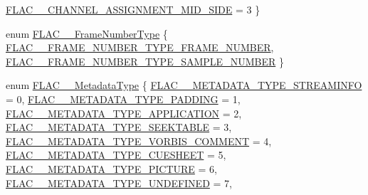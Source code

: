 \begin{DoxyCompactItemize}
\hyperlink{group__flac__format_gga79855f8525672e37f299bbe02952ef9ca85c1512c0473b5ede364a9943759a80c}{F\+L\+A\+C\+\_\+\+\_\+\+C\+H\+A\+N\+N\+E\+L\+\_\+\+A\+S\+S\+I\+G\+N\+M\+E\+N\+T\+\_\+\+M\+I\+D\+\_\+\+S\+I\+DE} = 3
 \}
\item 
enum \hyperlink{group__flac__format_ga8fe9ebc78386cd2a3d23b7b8e3818e1c}{F\+L\+A\+C\+\_\+\+\_\+\+Frame\+Number\+Type} \{ \hyperlink{group__flac__format_gga8fe9ebc78386cd2a3d23b7b8e3818e1ca0b9cbf3853f0ae105cf9b5360164f794}{F\+L\+A\+C\+\_\+\+\_\+\+F\+R\+A\+M\+E\+\_\+\+N\+U\+M\+B\+E\+R\+\_\+\+T\+Y\+P\+E\+\_\+\+F\+R\+A\+M\+E\+\_\+\+N\+U\+M\+B\+ER}, 
\hyperlink{group__flac__format_gga8fe9ebc78386cd2a3d23b7b8e3818e1ca9220ce93dcc151e5edd5db7e7155b35a}{F\+L\+A\+C\+\_\+\+\_\+\+F\+R\+A\+M\+E\+\_\+\+N\+U\+M\+B\+E\+R\+\_\+\+T\+Y\+P\+E\+\_\+\+S\+A\+M\+P\+L\+E\+\_\+\+N\+U\+M\+B\+ER}
 \}
\item 
enum \hyperlink{group__flac__format_gac71714ba8ddbbd66d26bb78a427fac01}{F\+L\+A\+C\+\_\+\+\_\+\+Metadata\+Type} \{ \newline
\hyperlink{group__flac__format_ggac71714ba8ddbbd66d26bb78a427fac01acffa517e969ba6a868dcf10e5da75c28}{F\+L\+A\+C\+\_\+\+\_\+\+M\+E\+T\+A\+D\+A\+T\+A\+\_\+\+T\+Y\+P\+E\+\_\+\+S\+T\+R\+E\+A\+M\+I\+N\+FO} = 0, 
\hyperlink{group__flac__format_ggac71714ba8ddbbd66d26bb78a427fac01a6dcb741fc0aef389580f110e88beb896}{F\+L\+A\+C\+\_\+\+\_\+\+M\+E\+T\+A\+D\+A\+T\+A\+\_\+\+T\+Y\+P\+E\+\_\+\+P\+A\+D\+D\+I\+NG} = 1, 
\hyperlink{group__flac__format_ggac71714ba8ddbbd66d26bb78a427fac01a2b287a22a1ac9440b309127884c8d41b}{F\+L\+A\+C\+\_\+\+\_\+\+M\+E\+T\+A\+D\+A\+T\+A\+\_\+\+T\+Y\+P\+E\+\_\+\+A\+P\+P\+L\+I\+C\+A\+T\+I\+ON} = 2, 
\hyperlink{group__flac__format_ggac71714ba8ddbbd66d26bb78a427fac01a5f6323e489be1318f0e3747960ebdd91}{F\+L\+A\+C\+\_\+\+\_\+\+M\+E\+T\+A\+D\+A\+T\+A\+\_\+\+T\+Y\+P\+E\+\_\+\+S\+E\+E\+K\+T\+A\+B\+LE} = 3, 
\newline
\hyperlink{group__flac__format_ggac71714ba8ddbbd66d26bb78a427fac01ad013576bc5196b907547739518605520}{F\+L\+A\+C\+\_\+\+\_\+\+M\+E\+T\+A\+D\+A\+T\+A\+\_\+\+T\+Y\+P\+E\+\_\+\+V\+O\+R\+B\+I\+S\+\_\+\+C\+O\+M\+M\+E\+NT} = 4, 
\hyperlink{group__flac__format_ggac71714ba8ddbbd66d26bb78a427fac01a0b3f07ae60609126562cd0233ce00a65}{F\+L\+A\+C\+\_\+\+\_\+\+M\+E\+T\+A\+D\+A\+T\+A\+\_\+\+T\+Y\+P\+E\+\_\+\+C\+U\+E\+S\+H\+E\+ET} = 5, 
\hyperlink{group__flac__format_ggac71714ba8ddbbd66d26bb78a427fac01acf28ae2788366617c1aeab81d5961c6e}{F\+L\+A\+C\+\_\+\+\_\+\+M\+E\+T\+A\+D\+A\+T\+A\+\_\+\+T\+Y\+P\+E\+\_\+\+P\+I\+C\+T\+U\+RE} = 6, 
\hyperlink{group__flac__format_ggac71714ba8ddbbd66d26bb78a427fac01acf6ac61fcc866608f5583c275dc34d47}{F\+L\+A\+C\+\_\+\+\_\+\+M\+E\+T\+A\+D\+A\+T\+A\+\_\+\+T\+Y\+P\+E\+\_\+\+U\+N\+D\+E\+F\+I\+N\+ED} = 7, 

\end{DoxyCompactItemize}
